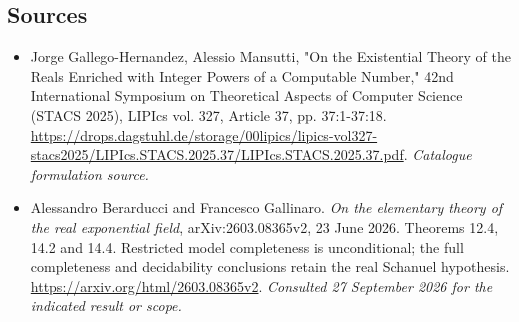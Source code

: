 \documentclass[11pt,a4paper]{article}
\numberwithin{equation}{section}
\begin{document}
\subsection{Sources}
\begin{itemize}\raggedright
\item[\textnormal{[S1]}]\hypertarget{source:1462:1}{} Jorge Gallego-Hernandez, Alessio Mansutti, "On the Existential Theory of the Reals Enriched with Integer Powers of a Computable Number," 42nd International Symposium on Theoretical Aspects of Computer Science (STACS 2025), LIPIcs vol. 327, Article 37, pp. 37:1-37:18.
\url{https://drops.dagstuhl.de/storage/00lipics/lipics-vol327-stacs2025/LIPIcs.STACS.2025.37/LIPIcs.STACS.2025.37.pdf}.
{\small\textit{Catalogue formulation source.}}
\item[\textnormal{[E1]}]\hypertarget{extra:1462:1}{} Alessandro Berarducci and Francesco Gallinaro.
\emph{On the elementary theory of the real exponential field}, arXiv:2603.08365v2, 23 June 2026. Theorems 12.4, 14.2 and 14.4. Restricted model completeness is unconditional; the full completeness and decidability conclusions retain the real Schanuel hypothesis.
\url{https://arxiv.org/html/2603.08365v2}.
{\small\textit{Consulted 27 September 2026 for the indicated result or scope.}}
\end{itemize}
\end{document}
